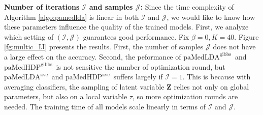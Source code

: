 \documentclass[twoside,11pt]{article}
\newcommand{\Zv}{\bm{Z}}
\newcommand\paMedLDAave{$\text{paMedLDA}^{\text{ave}}$~}
\newcommand\paMedLDAgibbs{$\text{paMedLDA}^{\text{gibbs}}$~}
\newcommand\paMedHDPave{$\text{paMedHDP}^{\text{ave}}$~}
\newcommand\paMedHDPgibbs{$\text{paMedHDP}^{\text{gibbs}}$~}
\begin{document}
\textbf{Number of iterations $\mathcal{I}$ and samples $\mathcal{J}$: } Since the time complexity of Algorithm \ref{algo:pamedlda} is linear in both $\mathcal{I}$ and $\mathcal{J}$, we would like to know how these parameters influence the quality of the trained models.  First, we analyze which setting of $(\mathcal{I}, \mathcal{J})$ guarantees good performance. Fix $\beta = 0, K = 40$.
Figure \ref{fg:multic_IJ} presents the results. %
First, the number of samples $\mathcal{J}$ does not have a large effect on the accuracy. Second, the peformance of \paMedLDAgibbs and \paMedHDPgibbs is not sensitive the number of optimization round, but \paMedLDAave and \paMedHDPave suffers largely if $\mathcal{I} = 1$. This is because with averaging classifiers, the sampling of latent variable $\Zv$ relies not only on global parameters, but also on a local variable $\tau$, so more optimization rounds are needed. The training time of all models scale linearly in terms of $\mathcal{I}$ and $\mathcal{J}$.
\end{document}
